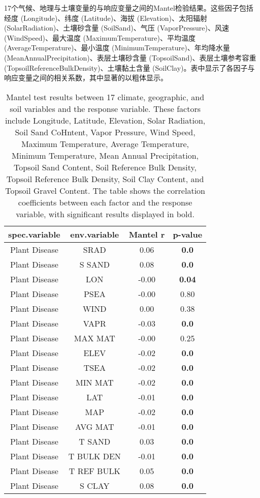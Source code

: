 \documentclass[AutoFakeBold]{LZUThesis-PgD&PhD}
\begin{document}
	\begin{table}[H]
		\centering
		\caption{17个气候、地理与土壤变量的与响应变量之间的Mantel检验结果。这些因子包括经度 (Longitude)、纬度 (Latitude)、海拔 (Elevation)、太阳辐射 (SolarRadiation)、土壤砂含量 (SoilSand)、气压 (VaporPressure)、风速 (WindSpeed)、最大温度 (MaximumTemperature)、平均温度 (AverageTemperature)、最小温度 (MinimumTemperature)、年均降水量 (MeanAnnualPrecipitation)、表层土壤砂含量 (TopsoilSand)、表层土壤参考容重 (TopsoilReferenceBulkDensity)、土壤黏土含量 (SoilClay)。表中显示了各因子与响应变量之间的相关系数，其中显著的以粗体显示。}
		\caption*{Mantel test results between 17 climate, geographic, and soil variables and the response variable. These factors include Longitude, Latitude, Elevation, Solar Radiation, Soil Sand CoHntent, Vapor Pressure, Wind Speed, Maximum Temperature, Average Temperature, Minimum Temperature, Mean Annual Precipitation, Topsoil Sand Content, Soil Reference Bulk Density, Topsoil Reference Bulk Density, Soil Clay Content, and Topsoil Gravel Content. The table shows the correlation coefficients between each factor and the response variable, with significant results displayed in bold.}
		\begin{tabular}{cccc}
			\toprule
			spec.variable & env.variable & Mantel r & p-value \\
			\midrule
			Plant Disease & SRAD & 0.06 & \textbf{0.0} \\
			Plant Disease & S SAND & 0.08 & \textbf{0.0} \\
			Plant Disease & LON & -0.00 & \textbf{0.04} \\
			Plant Disease & PSEA & -0.00 & 0.80 \\
			Plant Disease & WIND & 0.00 & 0.38 \\
			Plant Disease & VAPR & -0.03 & \textbf{0.0} \\
			Plant Disease & MAX MAT & -0.00 & 0.25 \\
			Plant Disease & ELEV & -0.02 & \textbf{0.0} \\
			Plant Disease & TSEA & -0.02 & \textbf{0.0} \\
			Plant Disease & MIN MAT & -0.02 & \textbf{0.0} \\
			Plant Disease & LAT & -0.01 & \textbf{0.0} \\
			Plant Disease & MAP & -0.02 & \textbf{0.0} \\
			Plant Disease & AVG MAT & -0.01 & \textbf{0.0} \\
			Plant Disease & T SAND & 0.03 & \textbf{0.0} \\
			Plant Disease & T BULK DEN & -0.01 & \textbf{0.0} \\
			Plant Disease & T REF BULK & 0.05 & \textbf{0.0} \\
			Plant Disease & S CLAY & 0.08 & \textbf{0.0} \\
			\bottomrule
		\end{tabular}
	\end{table}
	
\end{document}
